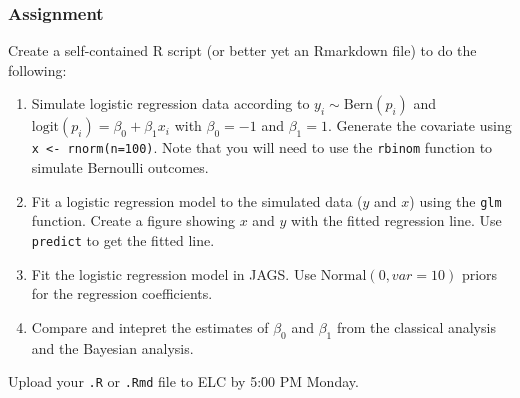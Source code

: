 \documentclass[color=usenames,dvipsnames]{beamer}\usepackage[]{graphicx}\usepackage[]{xcolor}
\newcommand{\inr}[1]{\colorbox{inlinecolor}{\texttt{#1}}}
\begin{document}
\begin{frame}
  \frametitle{Assignment}
  \small
  Create a self-contained R script (or better yet an Rmarkdown file)
  to do the following:
  \begin{enumerate}
    \small
    \item Simulate logistic regression data according to
      $y_i \sim \mathrm{Bern}(p_i)$ and $\mathrm{logit}(p_i) = \beta_0
      + \beta_1 x_i$ with $\beta_0=-1$ and $\beta_1=1$. Generate the
      covariate using \inr{x <- rnorm(n=100)}. Note that you will need
      to use the \inr{rbinom} function to simulate Bernoulli outcomes.
    \item Fit a logistic regression model to the simulated data ($y$
      and $x$) using the \inr{glm} function. Create a figure showing
      $x$ and $y$ with the fitted regression line. Use
      \inr{predict} to get the fitted line.
    \item Fit the logistic regression model in JAGS. Use
      $\mathrm{Normal}(0, var=10)$ priors for the regression
      coefficients. %
    \item Compare and intepret the estimates of $\beta_0$ and
      $\beta_1$ from the classical analysis and the Bayesian analysis.
  \end{enumerate}
  Upload your {\tt .R} or {\tt .Rmd} file to ELC by 5:00 PM Monday.
\end{frame}
\end{document}
